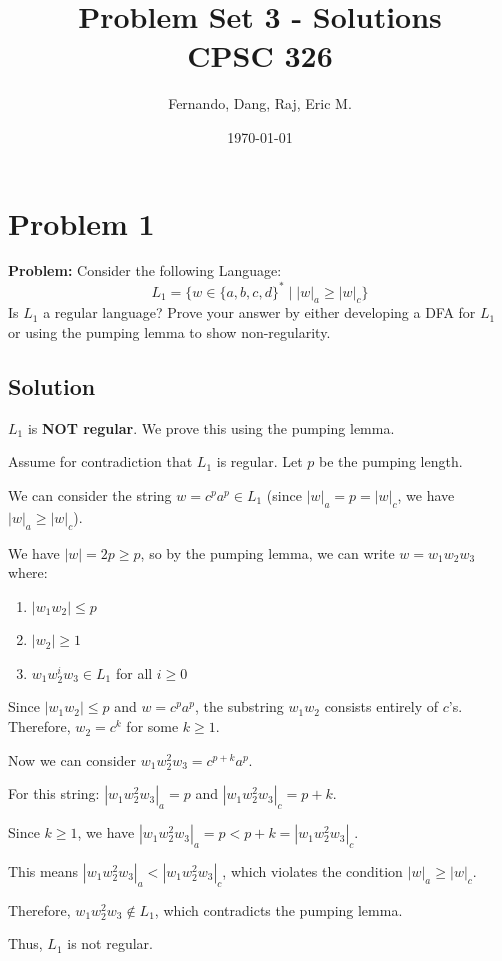 \documentclass[12pt]{article}
\title{Problem Set 3 - Solutions\\CPSC 326}
\author{Fernando, Dang, Raj, Eric M.}
\date{\today}
\begin{document}
\maketitle

\section*{Problem 1}

\textbf{Problem:} Consider the following Language:
$$L_1 = \{w \in \{a, b, c, d\}^* \mid |w|_a \geq |w|_c\}$$
Is $L_1$ a regular language? Prove your answer by either developing a DFA for $L_1$ or using the pumping lemma to show non-regularity.

\subsection*{Solution}

$L_1$ is \textbf{NOT regular}. We prove this using the pumping lemma.


Assume for contradiction that $L_1$ is regular. Let $p$ be the pumping length.

We can consider the string $w = c^p a^p \in L_1$ (since $|w|_a = p = |w|_c$, we have $|w|_a \geq |w|_c$).

We have $|w| = 2p \geq p$, so by the pumping lemma, we can write $w = w_1w_2w_3$ where:
\begin{enumerate}
    \item $|w_1w_2| \leq p$
    \item $|w_2| \geq 1$
    \item $w_1w_2^iw_3 \in L_1$ for all $i \geq 0$
\end{enumerate}

Since $|w_1w_2| \leq p$ and $w = c^p a^p$, the substring $w_1w_2$ consists entirely of $c$'s. Therefore, $w_2 = c^k$ for some $k \geq 1$.

Now we can consider $w_1w_2^2w_3 = c^{p+k}a^p$.

For this string: $|w_1w_2^2w_3|_a = p$ and $|w_1w_2^2w_3|_c = p + k$.

Since $k \geq 1$, we have $|w_1w_2^2w_3|_a = p < p + k = |w_1w_2^2w_3|_c$.

This means $|w_1w_2^2w_3|_a < |w_1w_2^2w_3|_c$, which violates the condition $|w|_a \geq |w|_c$.

Therefore, $w_1w_2^2w_3 \notin L_1$, which contradicts the pumping lemma.

Thus, $L_1$ is not regular.
\end{document}
